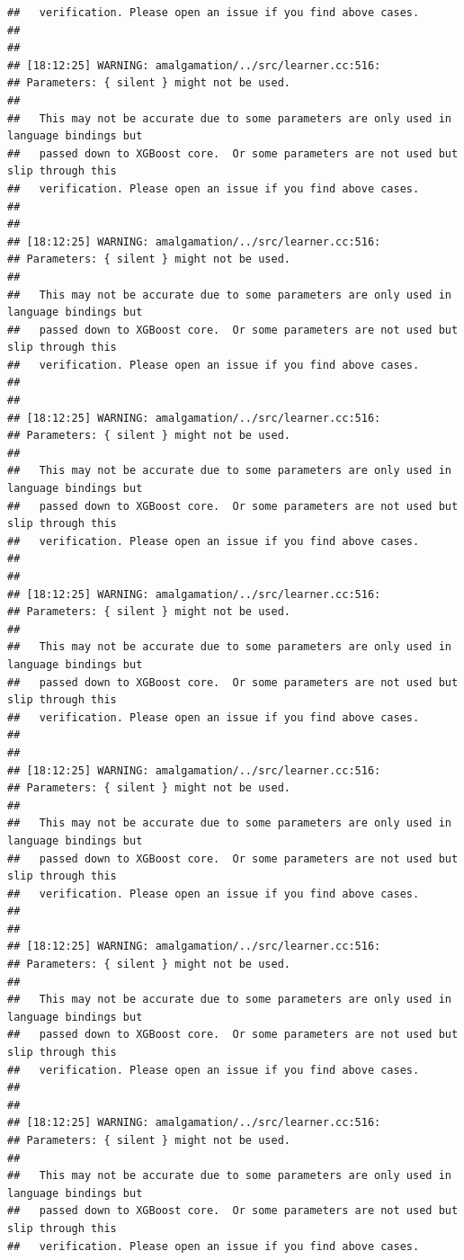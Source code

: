 \documentclass[AMS,STIX2COL]{WileyNJD-v2}\usepackage[]{graphicx}\usepackage[]{color}
\makeatletter
\newenvironment{kframe}{%
 \def\at@end@of@kframe{}%
 \ifinner\ifhmode%
  \def\at@end@of@kframe{\end{minipage}}%
  \begin{minipage}{\columnwidth}%
 \fi\fi%
 \def\FrameCommand##1{\hskip\@totalleftmargin \hskip-\fboxsep
 \colorbox{shadecolor}{##1}\hskip-\fboxsep
     \hskip-\linewidth \hskip-\@totalleftmargin \hskip\columnwidth}%
 \MakeFramed {\advance\hsize-\width
   \@totalleftmargin\z@ \linewidth\hsize
   \@setminipage}}%
 {\par\unskip\endMakeFramed%
 \at@end@of@kframe}
\newenvironment{knitrout}{}{} %
\makeatother
\begin{document}
\begin{knitrout}
\begin{kframe}
\begin{verbatim}
##   verification. Please open an issue if you find above cases.
## 
## 
## [18:12:25] WARNING: amalgamation/../src/learner.cc:516: 
## Parameters: { silent } might not be used.
## 
##   This may not be accurate due to some parameters are only used in language bindings but
##   passed down to XGBoost core.  Or some parameters are not used but slip through this
##   verification. Please open an issue if you find above cases.
## 
## 
## [18:12:25] WARNING: amalgamation/../src/learner.cc:516: 
## Parameters: { silent } might not be used.
## 
##   This may not be accurate due to some parameters are only used in language bindings but
##   passed down to XGBoost core.  Or some parameters are not used but slip through this
##   verification. Please open an issue if you find above cases.
## 
## 
## [18:12:25] WARNING: amalgamation/../src/learner.cc:516: 
## Parameters: { silent } might not be used.
## 
##   This may not be accurate due to some parameters are only used in language bindings but
##   passed down to XGBoost core.  Or some parameters are not used but slip through this
##   verification. Please open an issue if you find above cases.
## 
## 
## [18:12:25] WARNING: amalgamation/../src/learner.cc:516: 
## Parameters: { silent } might not be used.
## 
##   This may not be accurate due to some parameters are only used in language bindings but
##   passed down to XGBoost core.  Or some parameters are not used but slip through this
##   verification. Please open an issue if you find above cases.
## 
## 
## [18:12:25] WARNING: amalgamation/../src/learner.cc:516: 
## Parameters: { silent } might not be used.
## 
##   This may not be accurate due to some parameters are only used in language bindings but
##   passed down to XGBoost core.  Or some parameters are not used but slip through this
##   verification. Please open an issue if you find above cases.
## 
## 
## [18:12:25] WARNING: amalgamation/../src/learner.cc:516: 
## Parameters: { silent } might not be used.
## 
##   This may not be accurate due to some parameters are only used in language bindings but
##   passed down to XGBoost core.  Or some parameters are not used but slip through this
##   verification. Please open an issue if you find above cases.
## 
## 
## [18:12:25] WARNING: amalgamation/../src/learner.cc:516: 
## Parameters: { silent } might not be used.
## 
##   This may not be accurate due to some parameters are only used in language bindings but
##   passed down to XGBoost core.  Or some parameters are not used but slip through this
##   verification. Please open an issue if you find above cases.

\end{verbatim}
\end{kframe}
\end{knitrout}
\end{document}
